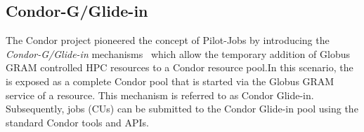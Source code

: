 \documentclass[conference]{IEEEtran}
\begin{document}
\subsection{Condor-G/Glide-in}

The Condor project pioneered the concept of Pilot-Jobs by introducing the
\textit{Condor-G/Glide-in} mechanisms~\cite{condor-g} which allow the
temporary addition of Globus GRAM controlled HPC resources to a Condor
resource pool.In this scenario, the \pilot is exposed as a complete Condor
pool that is started via the Globus GRAM service of a resource. This mechanism
is referred to as Condor Glide-in. Subsequently, jobs (CUs) can be submitted
to the Condor Glide-in pool using the standard Condor tools and APIs.

% 

\end{document}
